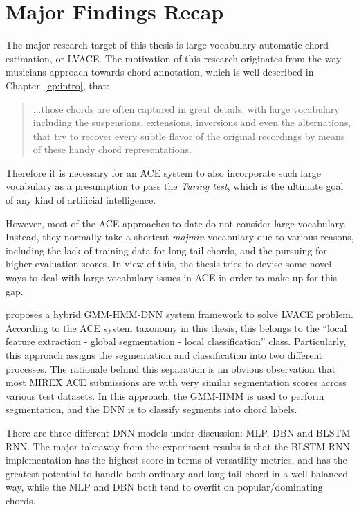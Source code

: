 \section{Major Findings Recap} \label{sec:6-recap}
The major research target of this thesis is large vocabulary automatic chord estimation, or LVACE. The motivation of this research originates from the way musicians approach towards chord annotation, which is well described in Chapter~\ref{cp:intro}, that:
\begin{quote}
...those chords are often captured in great details, with large vocabulary including the suspensions, extensions, inversions and even the alternations, that try to recover every subtle flavor of the original recordings by means of these handy chord representations.
\end{quote}
Therefore it is necessary for an ACE system to also incorporate such large vocabulary as a presumption to pass the \textit{Turing test}, which is the ultimate goal of any kind of artificial intelligence.

However, most of the ACE approaches to date do not consider large vocabulary. Instead, they normally take a shortcut \textit{majmin} vocabulary due to various reasons, including the lack of training data for long-tail chords, and the pursuing for higher evaluation scores. In view of this, the thesis tries to devise some novel ways to deal with large vocabulary issues in ACE in order to make up for this gap.

 proposes a hybrid GMM-HMM-DNN system framework to solve LVACE problem. According to the ACE system taxonomy in this thesis, this belongs to the ``local feature extraction - global segmentation - local classification'' class. Particularly, this approach assigns the segmentation and classification into two different processes. The rationale behind this separation is an obvious observation that most MIREX ACE submissions are with very similar segmentation scores across various test datasets. In this approach, the GMM-HMM is used to perform segmentation, and the DNN is to classify segments into chord labels.

There are three different DNN models under discussion: MLP, DBN and BLSTM-RNN. The major takeaway from the experiment results is that the BLSTM-RNN implementation has the highest score in terms of versatility metrics, and has the greatest potential to handle both ordinary and long-tail chord in a well balanced way, while the MLP and DBN both tend to overfit on popular/dominating chords.

